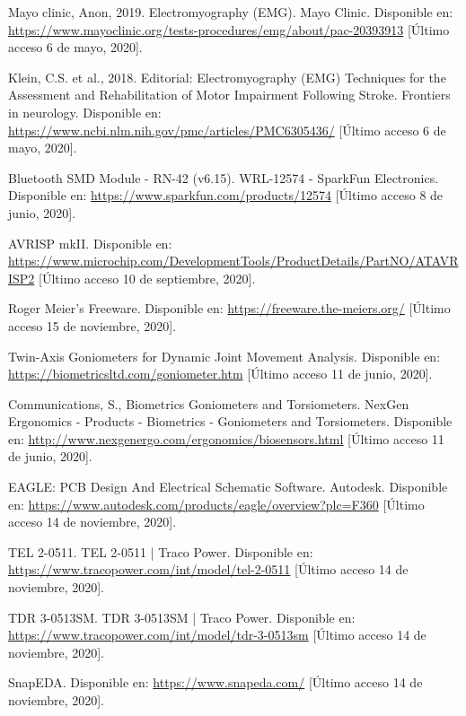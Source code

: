 \begin{thebibliography}{99}
 Mayo clinic, Anon, 2019. Electromyography (EMG). Mayo Clinic. Disponible en: \url{https://www.mayoclinic.org/tests-procedures/emg/about/pac-20393913} [Último acceso 6 de mayo, 2020].

 Klein, C.S. et al., 2018. Editorial: Electromyography (EMG) Techniques for the Assessment and Rehabilitation of Motor Impairment Following Stroke. Frontiers in neurology.  Disponible en: \url{https://www.ncbi.nlm.nih.gov/pmc/articles/PMC6305436/} [Último acceso 6 de mayo, 2020].


 Bluetooth SMD Module - RN-42 (v6.15). WRL-12574 - SparkFun Electronics. Disponible en: \url{https://www.sparkfun.com/products/12574} [Último acceso 8 de junio, 2020].

 AVRISP mkII. Disponible en: \url{https://www.microchip.com/DevelopmentTools/ProductDetails/PartNO/ATAVRISP2} [Último acceso 10 de septiembre, 2020].

 Roger Meier's Freeware. Disponible en: \url{https://freeware.the-meiers.org/} [Último acceso 15 de noviembre, 2020].


 Twin-Axis Goniometers for Dynamic Joint Movement Analysis. Disponible en: \url{https://biometricsltd.com/goniometer.htm} [Último acceso 11 de junio, 2020].

 Communications, S., Biometrics Goniometers and Torsiometers. NexGen Ergonomics - Products - Biometrics - Goniometers and Torsiometers. Disponible en: \url{http://www.nexgenergo.com/ergonomics/biosensors.html} [Último acceso 11 de junio, 2020].

 EAGLE: PCB Design And Electrical Schematic Software. Autodesk. Disponible en: \url{https://www.autodesk.com/products/eagle/overview?plc=F360} [Último acceso 14 de noviembre, 2020].

 TEL 2-0511. TEL 2-0511 | Traco Power. Disponible en: \url{https://www.tracopower.com/int/model/tel-2-0511} [Último acceso 14 de noviembre, 2020].

 TDR 3-0513SM. TDR 3-0513SM | Traco Power. Disponible en: \url{https://www.tracopower.com/int/model/tdr-3-0513sm} [Último acceso 14 de noviembre, 2020].

 SnapEDA. Disponible en: \url{https://www.snapeda.com/} [Último acceso 14 de noviembre, 2020].





\end{thebibliography}
